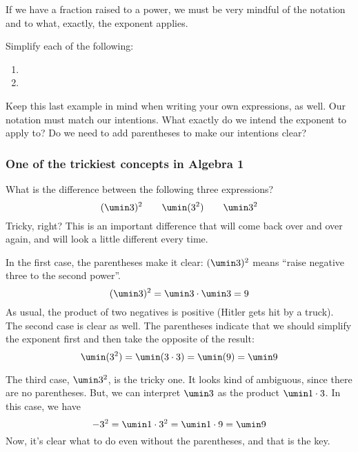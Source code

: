 If we have a fraction raised to a power, we must be very mindful of the notation and to what, exactly, the exponent applies.

\begin{boxex}
Simplify each of the following:

\begin{enumerate}[itemsep=10pt]
\item {}

\item {}
\end{enumerate}
\end{boxex}

Keep this last example in mind when writing your own expressions, as well. Our notation must match our intentions. What exactly do we intend the exponent to apply to? Do we need to add parentheses to make our intentions clear?

\subsubsection{One of the trickiest concepts in Algebra 1}

What is the difference between the following three expressions? \[(\umin3)^2 \qquad \umin(3^2) \qquad \umin3^2\]
Tricky, right? This is an important difference that will come back over and over again, and will look a little different every time.

In the first case, the parentheses make it clear: $(\umin3)^2$ means ``raise negative three to the second power''.
\[(\umin3)^2 = \umin3 \cdot \umin3 = 9\]
As usual, the product of two negatives is positive (Hitler gets hit by a truck). The second case is clear as well. The parentheses indicate that we should simplify the exponent first and then take the opposite of the result:
\[\umin(3^2) = \umin(3\cdot3) = \umin(9) = \umin9\]

The third case, $\umin3^2$,  is the tricky one. It looks kind of ambiguous, since there are no parentheses. But, we can interpret $\umin3$ as the product $\umin1\cdot3$. In this case, we have
\[-3^2 = \umin1\cdot3^2 = \umin1\cdot9 = \umin9\]
Now, it's clear what to do even without the parentheses, and that is the key.

